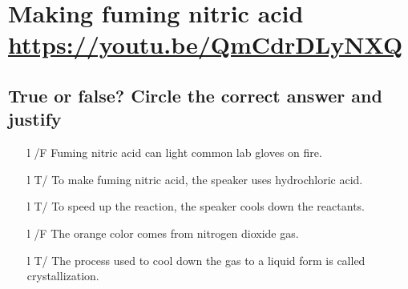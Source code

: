\documentclass[a4paper, 11pt, final, garamond]{book}
\begin{document}
\setcounter{chapter}{3}


\chapter{Making fuming nitric acid \url{https://youtu.be/QmCdrDLyNXQ}}

\section{True or false\!? \small Circle the correct answer and justify }
\begin{enumerate}[label=\sqenumi, leftmargin=10pt]
	\item[l]{/F} %
	      Fuming nitric acid can light common lab gloves on fire.
	      \smallbreak
	      \smallbreak
	      \dotfill
	\item[l]{T/} %
	      To make fuming nitric acid, the speaker uses hydrochloric acid.
	      \smallbreak
	      \smallbreak
	      \dotfill
	\item[l]{T/} %
	      To speed up the reaction, the speaker cools down the reactants.
	      \smallbreak
	      \smallbreak
	      \dotfill
	\item[l]{/F} %
	      The orange color comes from nitrogen dioxide gas.
	      \smallbreak
	      \smallbreak
	      \dotfill
	\item[l]{T/} %
	      The process used to cool down the gas to a liquid form is called
	      crystallization.
	      \smallbreak
\end{enumerate}
\end{document}
